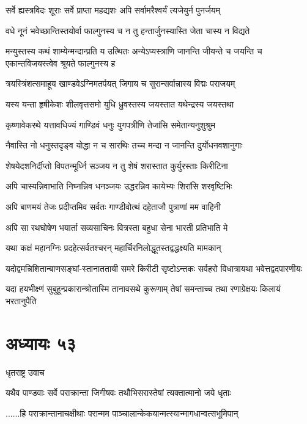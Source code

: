 \twolineshloka
{सर्वे ह्यस्त्रविदः शूराः सर्वे प्राप्ता महद्यशः}
{अपि सर्वामरैश्वर्यं त्यजेयुर्न पुनर्जयम्}


\twolineshloka
{वधे नूनं भवेच्छान्तिस्तयोर्वा फाल्गुनस्य च}
{न तु हन्तार्जुनस्यास्ति जेता चास्य न विद्यते}


\threelineshloka
{मन्युस्तस्य कथं शाम्येन्मन्दान्प्रति य उत्थितः}
{अन्येऽप्यस्त्राणि जानन्ति जीयन्ते च जयन्ति च}
{एकान्तविजयस्त्वेव श्रूयते फाल्गुनस्य ह}


\twolineshloka
{त्रयस्त्रिंशत्समाहूय खाण्डवेऽग्निमतर्पयत्}
{जिगाय च सुरान्सर्वान्नास्य विद्मः पराजयम्}


\twolineshloka
{यस्य यन्ता हृषीकेशः शीलवृत्तसमो युधि}
{ध्रुवस्तस्य जयस्तात यथेन्द्रस्य जयस्तथा}


\twolineshloka
{कृष्णावेकरथे यत्तावधिज्यं गाण्डिवं धनुः}
{युगपत्रीणि तेजांसि समेतान्यनुशुश्रुम}


\threelineshloka
{नैवास्ति नो धनुस्तदृङ्व योद्धा न च सारथिः}
{तच्च मन्दा न जानन्ति दुर्योधनवशानुगाः}
{}


\twolineshloka
{शेषयेदशनिर्दीप्तो विपतन्मूर्ध्नि सञ्जय}
{न तु शेषं शरास्तात कुर्युरस्ताः किरीटिना}


\twolineshloka
{अपि चास्यन्निवाभाति निघ्नन्निव धनञ्जयः}
{उद्धरन्निव कायेभ्यः शिरांसि शरवृष्टिभिः}


\twolineshloka
{अपि बाणमयं तेजः प्रदीप्तमिव सर्वतः}
{गाण्डीवोत्थं दहेताजौ पुत्राणां मम वाहिनी}


\twolineshloka
{अपि सा रथघोषेण भयार्ता सव्यसाचिनः}
{वित्रस्ता बहुधा सेना भारती प्रतिभाति मे}


\twolineshloka
{यथा कक्षं महानग्निः प्रदहेत्सर्वतश्चरन्}
{महार्चिरनिलोद्धूतस्तद्वद्धक्ष्यति मामकान्}


\twolineshloka
{यदोद्वमन्निशितान्बाणसङ्घां-स्तानाततायी समरे किरीटी}
{सृष्टोऽन्तकः सर्वहरो विधात्रायथा भवेत्तद्वदपारणीयः}


\twolineshloka
{यदा हयभीक्ष्णं सुबुहून्प्रकारान्श्रोतास्मि तानावसथे कुरूणाम्}
{तेषां समन्ताच्च तथा रणाग्रेक्षयः किलायं भरतानुपैति}


\chapter{अध्यायः ५३}
\twolineshloka
{धृतराष्ट्र उवाच}
{}


\twolineshloka
{यथैव पाण्डवाः सर्वे पराक्रान्ता जिगीषवः}
{तथौभिसरास्तेषां त्यक्तात्मानो जये धृताः}


\twolineshloka
{......हि पराक्रान्तानाचक्षीथाः परान्मम}
{पाञ्चालान्केकयान्मत्स्यान्मागधान्वत्सभूमिपान्}


